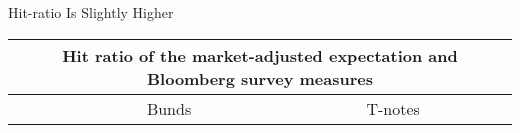 \documentclass[final]{beamer}
\begin{document}
\begin{frame}
\begin{columns}[t]
\begin{column}{.53 \linewidth}
\begin{columns}[t]
\begin{column}{.48 \linewidth}
\begin{block}{Hit-ratio Is Slightly Higher}
\begin{table}
{\tiny
\begin{tabular}{@{} l c c c c c c c c }
\toprule
\multicolumn{9}{c}{Hit ratio of the market-adjusted expectation and Bloomberg survey measures} \\
\midrule
&  \multicolumn{4}{c}{Bunds} & \multicolumn{4}{c}{T-notes} \\ 

\end{tabular}}
\end{table}
\end{block}
\end{column}
\end{columns}
\end{column}
\end{columns}
\end{frame}
\end{document}
